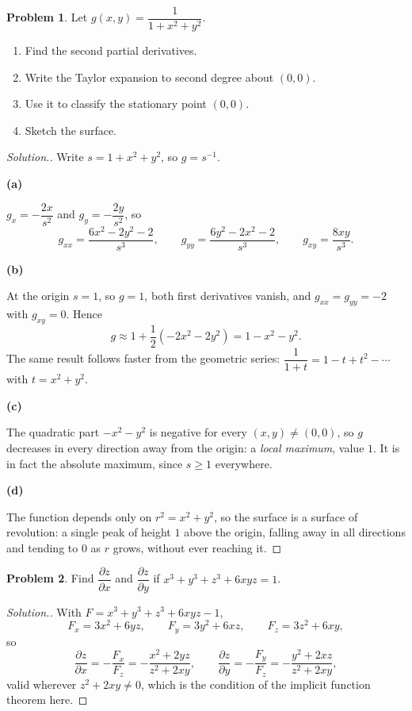 \documentclass[11pt,a4paper]{article}
\theoremstyle{definition}
\newtheorem{problemx}{Problem}[subsection]
\newenvironment{problem}{\begin{problemx}}{\end{problemx}}
\newenvironment{solution}
  {\renewcommand{\qedsymbol}{}\begin{proof}[\textit{Solution}.]}
  {\end{proof}}
\newcommand{\subhead}[1]{%
  \par\medskip\noindent\textbf{#1}\par\nobreak\smallskip}
\begin{document}
\begin{problem}
Let $g(x,y) = \dfrac{1}{1+x^2+y^2}$.
\begin{enumerate}
\item[(a)] Find the second partial derivatives.
\item[(b)] Write the Taylor expansion to second degree about $(0,0)$.
\item[(c)] Use it to classify the stationary point $(0,0)$.
\item[(d)] Sketch the surface.
\end{enumerate}
\end{problem}
\begin{solution}
Write $s = 1+x^2+y^2$, so $g = s^{-1}$.

\subhead{(a)}
$g_x = -\dfrac{2x}{s^2}$ and $g_y = -\dfrac{2y}{s^2}$, so
\[g_{xx} = \frac{6x^2-2y^2-2}{s^3},\qquad
g_{yy} = \frac{6y^2-2x^2-2}{s^3},\qquad
g_{xy} = \frac{8xy}{s^3}.\]

\subhead{(b)}
At the origin $s=1$, so $g = 1$, both first derivatives vanish, and
$g_{xx} = g_{yy} = -2$ with $g_{xy} = 0$. Hence
\[g \approx 1 + \frac12(-2x^2 - 2y^2) = 1 - x^2 - y^2 .\]
The same result follows faster from the geometric series:
$\dfrac{1}{1+t} = 1-t+t^2-\cdots$ with $t = x^2+y^2$.

\subhead{(c)}
The quadratic part $-x^2-y^2$ is negative for every $(x,y)\neq(0,0)$, so $g$
decreases in every direction away from the origin: a \emph{local maximum}, value
$1$. It is in fact the absolute maximum, since $s\geq 1$ everywhere.

\subhead{(d)}
The function depends only on $r^2 = x^2+y^2$, so the surface is a surface of
revolution: a single peak of height $1$ above the origin, falling away in all
directions and tending to $0$ as $r$ grows, without ever reaching it.
\end{solution}

\begin{problem}
Find $\dfrac{\partial z}{\partial x}$ and $\dfrac{\partial z}{\partial y}$ if
$x^3+y^3+z^3+6xyz = 1$.
\end{problem}
\begin{solution}
With $F = x^3+y^3+z^3+6xyz-1$,
\[F_x = 3x^2+6yz,\qquad F_y = 3y^2+6xz,\qquad F_z = 3z^2+6xy ,\]
so
\[\frac{\partial z}{\partial x} = -\frac{F_x}{F_z}
= -\frac{x^2+2yz}{z^2+2xy},\qquad
\frac{\partial z}{\partial y} = -\frac{F_y}{F_z}
= -\frac{y^2+2xz}{z^2+2xy},\]
valid wherever $z^2+2xy\neq 0$, which is the condition of the implicit function
theorem here.
\end{solution}
\end{document}
